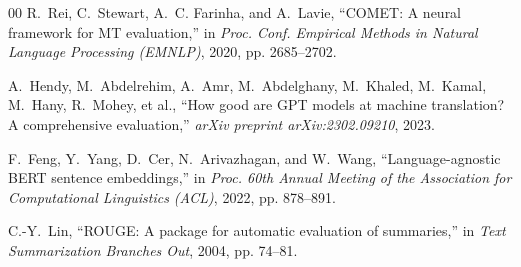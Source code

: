 \documentclass[conference]{IEEEtran}
\begin{document}
\begin{thebibliography}{00}
R.~Rei, C.~Stewart, A.~C. Farinha, and A.~Lavie, ``COMET: A neural framework for MT evaluation,'' in \textit{Proc. Conf. Empirical Methods in Natural Language Processing (EMNLP)}, 2020, pp. 2685--2702.

A.~Hendy, M.~Abdelrehim, A.~Amr, M.~Abdelghany, M.~Khaled, M.~Kamal, M.~Hany, R.~Mohey, et al., ``How good are GPT models at machine translation? A comprehensive evaluation,'' \textit{arXiv preprint arXiv:2302.09210}, 2023.

F.~Feng, Y.~Yang, D.~Cer, N.~Arivazhagan, and W.~Wang, ``Language-agnostic BERT sentence embeddings,'' in \textit{Proc. 60th Annual Meeting of the Association for Computational Linguistics (ACL)}, 2022, pp. 878--891.

C.-Y.~Lin, ``ROUGE: A package for automatic evaluation of summaries,'' in \textit{Text Summarization Branches Out}, 2004, pp. 74--81.

\end{thebibliography}
\end{document}
